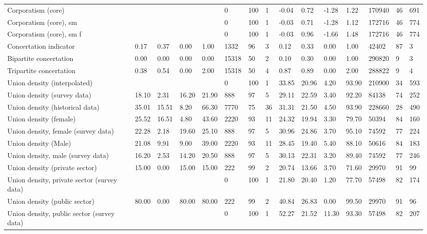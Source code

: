 \begin{longtable}{lllllllllllllll}
Corporatism (core) &  &  &  &  & 0 & 100 & 1 & -0.04 & 0.72 & -1.28 & 1.22 & 170940 & 46 & 691\\
\addlinespace
Corporatism (core), sm &  &  &  &  & 0 & 100 & 1 & -0.03 & 0.71 & -1.28 & 1.12 & 172716 & 46 & 774\\
Corporatism (core), sm f &  &  &  &  & 0 & 100 & 1 & -0.03 & 0.96 & -1.66 & 1.48 & 172716 & 46 & 774\\
Concertation indicator & 0.17 & 0.37 & 0.00 & 1.00 & 1332 & 96 & 3 & 0.12 & 0.33 & 0.00 & 1.00 & 42402 & 87 & 3\\
Bipartite concertation & 0.00 & 0.00 & 0.00 & 0.00 & 15318 & 50 & 2 & 0.10 & 0.30 & 0.00 & 1.00 & 290820 & 9 & 3\\
Tripartite concertation & 0.38 & 0.54 & 0.00 & 2.00 & 15318 & 50 & 4 & 0.87 & 0.89 & 0.00 & 2.00 & 288822 & 9 & 4\\
\addlinespace
Union density (interpolated) &  &  &  &  & 0 & 100 & 1 & 33.85 & 20.96 & 4.20 & 93.90 & 210900 & 34 & 593\\
Union density (survey data) & 18.10 & 2.31 & 16.20 & 21.90 & 888 & 97 & 5 & 29.11 & 22.59 & 3.40 & 92.20 & 84138 & 74 & 252\\
Union density (historical data) & 35.01 & 15.51 & 8.20 & 66.30 & 7770 & 75 & 36 & 31.31 & 21.50 & 4.50 & 93.90 & 228660 & 28 & 490\\
Union density (female) & 25.52 & 16.51 & 4.80 & 43.60 & 2220 & 93 & 11 & 24.32 & 19.94 & 3.30 & 79.70 & 50394 & 84 & 160\\
Union density, female (survey data) & 22.28 & 2.18 & 19.60 & 25.10 & 888 & 97 & 5 & 30.96 & 24.86 & 3.70 & 95.10 & 74592 & 77 & 224\\
\addlinespace
Union density (Male) & 21.08 & 9.91 & 9.00 & 39.00 & 2220 & 93 & 11 & 28.45 & 19.40 & 5.40 & 88.10 & 50616 & 84 & 183\\
Union density, male (survey data) & 16.20 & 2.53 & 14.20 & 20.50 & 888 & 97 & 5 & 30.13 & 22.31 & 3.20 & 89.40 & 74592 & 77 & 246\\
Union density (private sector) & 15.00 & 0.00 & 15.00 & 15.00 & 222 & 99 & 2 & 20.74 & 13.66 & 3.70 & 71.60 & 29970 & 91 & 99\\
Union density, private sector (survey data) &  &  &  &  & 0 & 100 & 1 & 21.80 & 20.40 & 1.20 & 77.70 & 57498 & 82 & 174\\
Union density (public sector) & 80.00 & 0.00 & 80.00 & 80.00 & 222 & 99 & 2 & 40.84 & 26.83 & 0.00 & 99.50 & 29970 & 91 & 96\\
\addlinespace
Union density, public sector (survey data) &  &  &  &  & 0 & 100 & 1 & 52.27 & 21.52 & 11.30 & 93.30 & 57498 & 82 & 207\\

\end{longtable}
